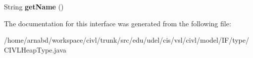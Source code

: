 \begin{DoxyCompactItemize}
\item 
\hypertarget{interfaceedu_1_1udel_1_1cis_1_1vsl_1_1civl_1_1model_1_1IF_1_1type_1_1CIVLHeapType_a5f518c10b996190571211c415eed3cc4}{}String {\bfseries get\+Name} ()\label{interfaceedu_1_1udel_1_1cis_1_1vsl_1_1civl_1_1model_1_1IF_1_1type_1_1CIVLHeapType_a5f518c10b996190571211c415eed3cc4}

\end{DoxyCompactItemize}


The documentation for this interface was generated from the following file\+:\begin{DoxyCompactItemize}
\item 
/home/arnabd/workspace/civl/trunk/src/edu/udel/cis/vsl/civl/model/\+I\+F/type/C\+I\+V\+L\+Heap\+Type.\+java\end{DoxyCompactItemize}
